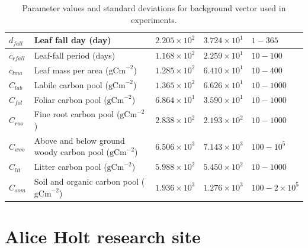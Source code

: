 \begin{table}[ht]
\begin{center}
\begin{tabular}{| l | p{4.5cm} | p{1.7cm} | p{1.7cm} | p{1.7cm} |}
$d_{fall}$ & Leaf fall day (day) & $2.205\times 10^{2}$ & $3.724\times 10^{1}$ & $1 - 365$ \\ \hline
$c_{rfall}$ & Leaf-fall period (days) & $1.168\times 10^{2}$ & $2.259\times 10^{1}$ & $10 - 100$ \\ \hline
$c_{lma}$ & Leaf mass per area ($\text{gCm}^{-2}$) & $1.285\times 10^{2}$ & $6.410\times 10^{1}$ & $10 - 400$ \\ \hline
$C_{lab}$ & Labile carbon pool ($\text{gCm}^{-2}$) & $1.365\times 10^{2}$ & $6.626\times 10^{1}$ & $10 - 1000$ \\ \hline
$C_{fol}$ & Foliar carbon pool ($\text{gCm}^{-2}$) & $6.864\times 10^{1}$ & $3.590\times 10^{1}$ & $10 - 1000$ \\ \hline
$C_{roo}$ & Fine root carbon pool ($\text{gCm}^{-2}$) & $2.838\times 10^{2}$ & $2.193\times 10^{2}$ & $10 - 1000$ \\ \hline
$C_{woo}$ & Above and below ground woody carbon pool ($\text{gCm}^{-2}$) & $6.506\times 10^{3}$ & $7.143\times 10^{3}$ & $100 - 10^{5}$ \\ \hline
$C_{lit}$ & Litter carbon pool ($\text{gCm}^{-2}$) & $5.988\times 10^{2}$ & $5.450\times 10^{2}$ & $10 - 1000$ \\ \hline
$C_{som}$ & Soil and organic carbon pool ($\text{gCm}^{-2}$) & $1.936\times 10^{3}$ & $1.276\times 10^{3}$ & $100 - 2 \times 10^{5}$  \\ \hline
	\end{tabular}
	\caption{Parameter values and standard deviations for background vector used in experiments.}
	\label{chap5:table:xbvars}
\end{center} 
\end{table}


\section{Alice Holt research site} \label{chap4:sec:aliceholt}

